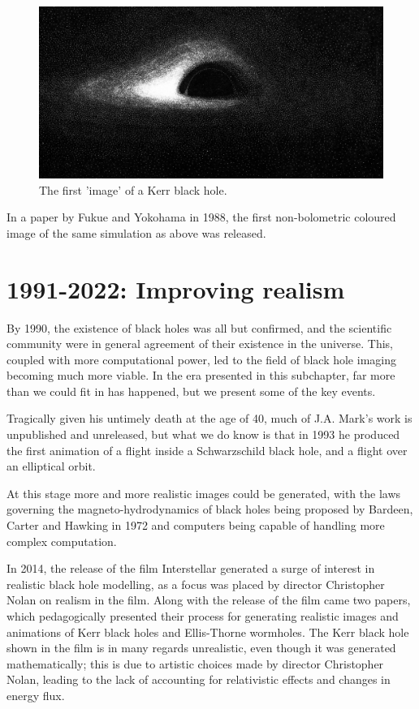 \documentclass[oneside,openright,frontopenright, singlespacing]{dmathesis}
\begin{document}
\begin{figure}[!ht]
	\centering
	\includegraphics[width=0.45\linewidth]{img/Luminet-drawing}
	\caption{The first 'image' of a Kerr black hole. \cite{luminet1979image}}
	\label{fig:Figure1.2}
\end{figure}

	In a paper by Fukue and Yokohama in 1988, the first non-bolometric coloured image of the same simulation as above was released\cite{fukue1988color}.

\section{1991-2022: Improving realism}\label{sec:Section1.3}

	By 1990, the existence of black holes was all but confirmed, and the scientific community were in general agreement of their existence in the universe. This, coupled with more computational power, led to the field of black hole imaging becoming much more viable. In the era presented in this subchapter, far more than we could fit in has happened, but we present some of the key events.

\vspace{1em}
	Tragically given his untimely death at the age of 40, much of J.A. Mark's work is unpublished and unreleased, but what we do know is that in 1993 he produced the first animation of a flight inside a Schwarzschild black hole, and a flight over an elliptical orbit\cite{InfinitelyCurved}.

\vspace{1em}
	At this stage more and more realistic images could be generated, with the laws governing the magneto-hydrodynamics of black holes being proposed by Bardeen, Carter and Hawking in 1972\cite{bardeen1973four} and computers being capable of handling more complex computation.

\vspace{1em}
	In 2014, the release of the film Interstellar generated a surge of interest in realistic black hole modelling, as a focus was placed by director Christopher Nolan on realism in the film. Along with the release of the film came two papers\cite{thorne2015gravitational}\cite{thorne2015visualizing}, which pedagogically presented their process for generating realistic images and animations of Kerr black holes and Ellis-Thorne wormholes. The Kerr black hole shown in the film is in many regards unrealistic, even though it was generated mathematically; this is due to artistic choices made by director Christopher Nolan, leading to the lack of accounting for relativistic effects and changes in energy flux.
\end{document}
